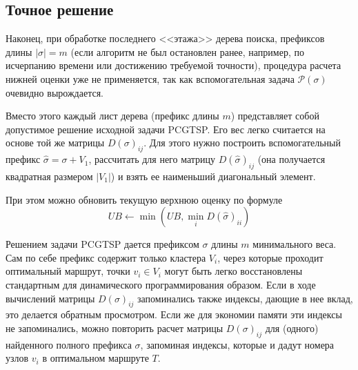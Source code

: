 
\subsection{Точное решение}
\label{sec:pgstcp.solution}

Наконец,
при обработке последнего
<<этажа>> дерева поиска,
префиксов длины
$|\sigma|=m$
(если алгоритм не был остановлен ранее,
например, по исчерпанию времени или
достижению требуемой точности),
процедура расчета нижней оценки уже не применяется,
так как вспомогательная задача
$\mathcal P(\sigma)$
очевидно вырождается.

Вместо этого каждый лист дерева
(префикс длины $m$)
представляет собой допустимое решение
исходной задачи PCGTSP.
Его вес легко считается на основе той же матрицы
$D(\sigma)_{ij}$.
Для этого нужно построить
вспомогательный префикс
$\hat \sigma = \sigma + V_1$,
рассчитать для него матрицу
$D(\hat \sigma)_{ij}$
(она получается квадратная размером $|V_1|$)
и взять ее наименьший диагональный элемент.

При этом можно обновить текущую верхнюю оценку
по формуле
$$
UB \gets \min(UB, \min_i D(\hat \sigma)_{ii})
$$

Решением задачи PCGTSP дается префиксом $\sigma$
длины $m$ минимального веса.
Сам по себе префикс содержит только кластера $V_i$,
через которые проходит оптимальный маршрут,
точки $v_i \in V_i$
могут быть легко восстановлены стандартным
для динамического программирования образом.
Если в ходе вычислений матрицы
$D(\sigma)_{ij}$
запоминались также индексы,
дающие в нее вклад,
это делается обратным просмотром.
Если же для экономии памяти
эти индексы не запоминались,
можно повторить расчет матрицы
$D(\sigma)_{ij}$
для (одного) найденного полного префикса $\sigma$,
запоминая индексы,
которые и дадут номера узлов
$v_i$
в оптимальном маршруте $T$.
